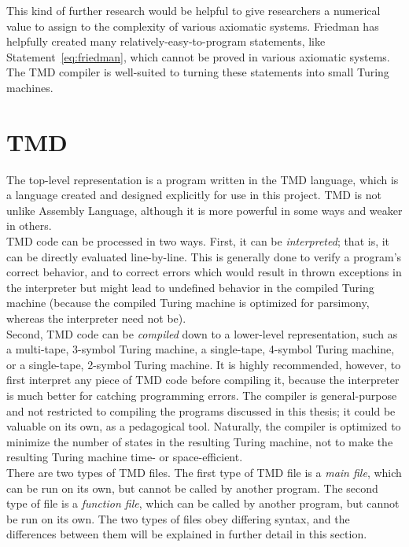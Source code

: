 \documentclass[11pt]{report}
\begin{document}
This kind of further research would be helpful to give researchers a numerical value to assign to the complexity of various axiomatic systems. Friedman has helpfully created many relatively-easy-to-program statements, like Statement~\ref{eq:friedman}, %
which cannot be proved in various axiomatic systems. The TMD compiler is well-suited to turning these statements into small Turing machines.

\section{TMD}

The top-level representation is a program written in the TMD language, which is a language created and designed explicitly for use in this project. TMD is not unlike Assembly Language, although it is more powerful in some ways and weaker in others. \\

TMD code can be processed in two ways. First, it can be \emph{interpreted}; that is, it can be directly evaluated line-by-line. This is generally done to verify a program's correct behavior, and to correct errors which would result in thrown exceptions in the interpreter but might lead to undefined behavior in the compiled Turing machine (because the compiled Turing machine is optimized for parsimony, whereas the interpreter need not be). \\

Second, TMD code can be \emph{compiled} down to a lower-level representation, such as a multi-tape, 3-symbol Turing machine, a single-tape, 4-symbol Turing machine, or a single-tape, 2-symbol Turing machine. It is highly recommended, however, to first interpret any piece of TMD code before compiling it, because the interpreter is much better for catching programming errors. The compiler is general-purpose and not restricted to compiling the programs discussed in this thesis; it could be valuable on its own, as a pedagogical tool. Naturally, the compiler is optimized to minimize the number of states in the resulting Turing machine, not to make the resulting Turing machine time- or space-efficient. \\

There are two types of TMD files. The first type of TMD file is a \emph{main file}, which can be run on its own, but cannot be called by another program. The second type of file is a \emph{function file}, which can be called by another program, but cannot be run on its own. The two types of files obey differing syntax, and the differences between them will be explained in further detail in this section. \\
\end{document}
